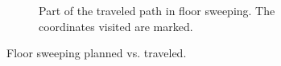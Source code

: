 \begin{figure}[ht]
\begin{subfigure}[t]{0.3\textwidth}
    \caption{Part of the traveled path in floor sweeping. The coordinates visited are marked.}
    \label{floor_sweep_robot}
  \end{subfigure}
\caption{Floor sweeping planned vs. traveled.}
\label{floor_sweeping_results}
\end{figure}
